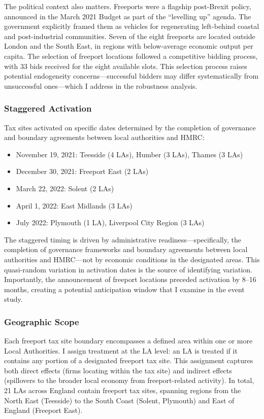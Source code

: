 \documentclass[12pt]{article}
\begin{document}
The political context also matters. Freeports were a flagship post-Brexit policy, announced in the March 2021 Budget as part of the ``levelling up'' agenda. The government explicitly framed them as vehicles for regenerating left-behind coastal and post-industrial communities. Seven of the eight freeports are located outside London and the South East, in regions with below-average economic output per capita. The selection of freeport locations followed a competitive bidding process, with 33 bids received for the eight available slots. This selection process raises potential endogeneity concerns---successful bidders may differ systematically from unsuccessful ones---which I address in the robustness analysis.

\subsubsection*{Staggered Activation} Tax sites activated on specific dates determined by the completion of governance and boundary agreements between local authorities and HMRC:

\begin{itemize}
  \item November 19, 2021: Teesside (4 LAs), Humber (3 LAs), Thames (3 LAs)
  \item December 30, 2021: Freeport East (2 LAs)
  \item March 22, 2022: Solent (2 LAs)
  \item April 1, 2022: East Midlands (3 LAs)
  \item July 2022: Plymouth (1 LA), Liverpool City Region (3 LAs)
\end{itemize}

The staggered timing is driven by administrative readiness---specifically, the completion of governance frameworks and boundary agreements between local authorities and HMRC---not by economic conditions in the designated areas. This quasi-random variation in activation dates is the source of identifying variation. Importantly, the announcement of freeport locations preceded activation by 8--16 months, creating a potential anticipation window that I examine in the event study.

\subsubsection*{Geographic Scope} Each freeport tax site boundary encompasses a defined area within one or more Local Authorities. I assign treatment at the LA level: an LA is treated if it contains any portion of a designated freeport tax site. This assignment captures both direct effects (firms locating within the tax site) and indirect effects (spillovers to the broader local economy from freeport-related activity). In total, 21 LAs across England contain freeport tax sites, spanning regions from the North East (Teesside) to the South Coast (Solent, Plymouth) and East of England (Freeport East).
\end{document}
